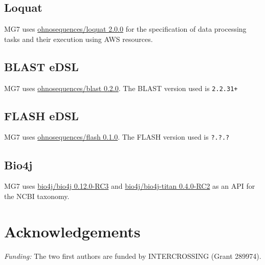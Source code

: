 \documentclass{frontiersSCNS} %
\begin{document}
\subsection{Loquat}\label{loquat}

MG7 uses
\href{https://github.com/ohnosequences/loquat/releases/tag/v2.0.0}{ohnosequences/loquat
2.0.0} for the specification of data processing tasks and their
execution using AWS resources.

\subsection{BLAST eDSL}\label{blast-edsl}

MG7 uses
\href{https://github.com/ohnosequences/blast/releases/tag/v0.2.0}{ohnosequences/blast
0.2.0}. The BLAST version used is \texttt{2.2.31+}

\subsection{FLASH eDSL}\label{flash-edsl}

MG7 uses
\href{https://github.com/ohnosequences/flash/releases/tag/v0.1.0}{ohnosequences/flash
0.1.0}. The FLASH version used is \texttt{?.?.?}

\subsection{Bio4j}\label{bio4j}

MG7 uses
\href{https://github.com/bio4j/bio4j/releases/tag/v0.12.0-RC3}{bio4j/bio4j
0.12.0-RC3} and
\href{https://github.com/bio4j/bio4j-titan/releases/tag/v0.4.0-RC2}{bio4j/bio4j-titan
0.4.0-RC2} as an API for the NCBI taxonomy.

\section{Acknowledgements}\label{acknowledgements}

\emph{Funding:} The two first authors are funded by INTERCROSSING (Grant
289974).


\end{document}
